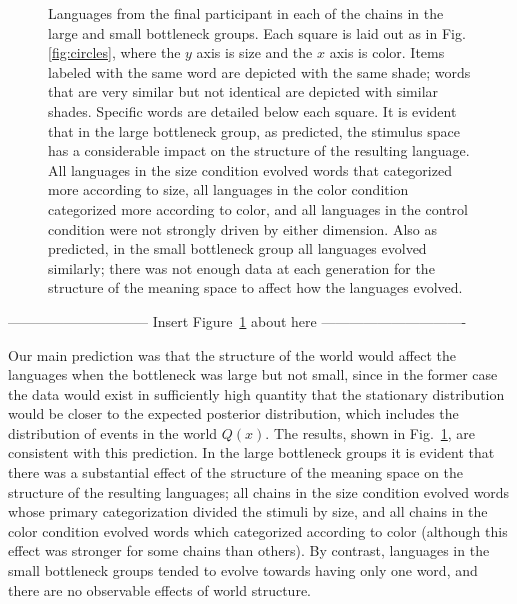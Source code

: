 \documentclass{apa}
\begin{document}
\begin{figure}
\begin{center}
\begin{tabular}{cc}
\end{tabular}
\end{center}
\vspace{-5mm}
\caption{Languages from the final participant in each of the chains in the {\sc large} and {\sc small} bottleneck groups. Each square is laid out as in Fig.\ref{fig:circles}, where the $y$ axis is size and the $x$ axis is color. Items labeled with the same word are depicted with the same shade; words that are very similar but not identical are depicted with similar shades. Specific words are detailed below each square. It is evident that in the {\sc large} bottleneck group, as predicted, the stimulus space has a considerable impact on the structure of the resulting language. All languages in the {\sc size} condition evolved words that categorized more according to size, all languages in the {\sc color} condition categorized more according to color, and all languages in the {\sc control} condition were not strongly driven by either dimension. Also as predicted, in the {\sc small} bottleneck group all languages evolved similarly; there was not enough data at each generation for the structure of the meaning space to affect how the languages evolved.}
\label{fig:individuals}
\end{figure}

\vspace{5mm}
------------------------------ Insert Figure~\ref{fig:individuals} about here -------------------------------
\vspace{5mm}


Our main prediction was that the structure of the world would affect the languages when the bottleneck was {\sc large} but not {\sc small}, since in the former case the data would exist in sufficiently high quantity that the stationary distribution would be closer to the expected posterior distribution, which includes the distribution of events in the world $Q(x)$. The results, shown in Fig.~\ref{fig:individuals}, are consistent with this prediction. In the {\sc large} bottleneck groups it is evident that there was a substantial effect of the structure of the meaning space on the structure of the resulting languages; all chains in the {\sc size} condition evolved words whose primary categorization divided the stimuli by size, and all chains in the {\sc color} condition evolved words which categorized according to color (although this effect was stronger for some chains than others).  By contrast, languages in the {\sc small} bottleneck groups tended to evolve towards having only one word, and there are no observable effects of world structure.
\end{document}
